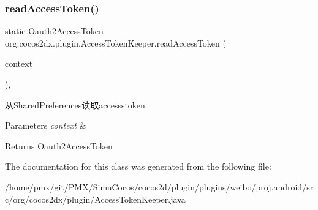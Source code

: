 \subsubsection{\texorpdfstring{read\+Access\+Token()}{readAccessToken()}}
{\footnotesize\ttfamily static Oauth2\+Access\+Token org.\+cocos2dx.\+plugin.\+Access\+Token\+Keeper.\+read\+Access\+Token (\begin{DoxyParamCaption}\item[{Context}]{context }\end{DoxyParamCaption})\hspace{0.3cm}{\ttfamily [inline]}, {\ttfamily [static]}}

从\+Shared\+Preferences读取accessstoken 
\begin{DoxyParams}{Parameters}
{\em context} & \\
\hline
\end{DoxyParams}
\begin{DoxyReturn}{Returns}
Oauth2\+Access\+Token 
\end{DoxyReturn}


The documentation for this class was generated from the following file\+:\begin{DoxyCompactItemize}
\item 
/home/pmx/git/\+P\+M\+X/\+Simu\+Cocos/cocos2d/plugin/plugins/weibo/proj.\+android/src/org/cocos2dx/plugin/Access\+Token\+Keeper.\+java\end{DoxyCompactItemize}
